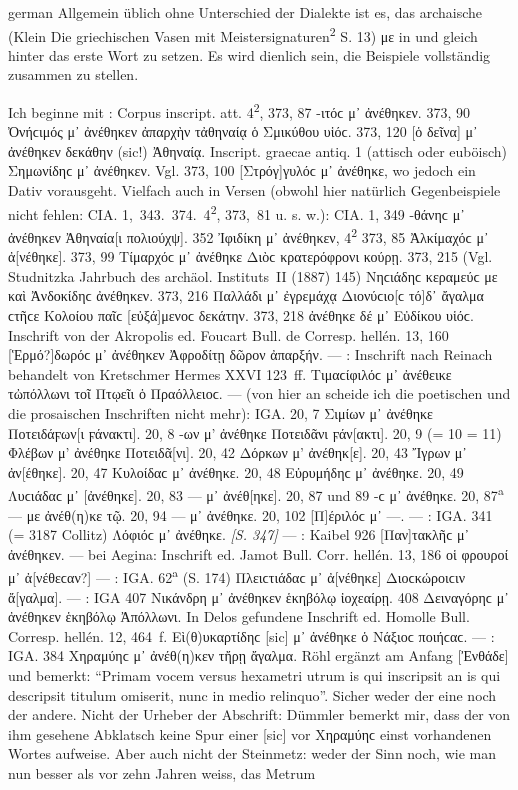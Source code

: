 \begin{otherlanguage*}{german}
Allgemein üblich ohne Unterschied der Dialekte ist es, das archaische (Klein Die griechischen Vasen mit Meistersignaturen\textsuperscript{2} S. 13) με in  und  gleich hinter das erste Wort zu setzen. Es wird dienlich sein, die Beispiele vollständig zusammen zu stellen.

Ich beginne mit :  Corpus inscript. att. 4\textsuperscript{2}, 373, 87 -ιτόϲ μ᾽ ἀνέθηκεν. 373, 90 Ὀνήϲιμός μ᾽ ἀνέθηκεν ἀπαρχὴν τἀθηναίᾳ ὁ Σμικύθου υἱόϲ. 373, 120 [ὁ δεῖνα] μ᾽ ἀνέθηκεν δεκάθην (sic!) Ἀθηναίᾳ. Inscript. graecae antiq. 1 (attisch oder euböisch) Σημωνίδηϲ μ᾽ ἀνέθηκεν. Vgl. 373, 100 [Στρόγ]γυλόϲ μ᾽ ἀνέθηκε, wo jedoch ein Dativ vorausgeht. Vielfach auch in Versen (obwohl hier natürlich Gegenbeispiele nicht fehlen: CIA. 1,~343.~374.~4\textsuperscript{2}, 373,~81 u. s. w.): CIA. 1, 349 -θάνηϲ μ᾽ ἀνέθηκεν Ἀθηναία[ι πολιούχψ]. 352 Ἰφιδίκη μ᾽ ἀνέθηκεν, 4\textsuperscript{2} 373, 85 Ἀλκίμαχόϲ μ᾽ ἀ[νέθηκε]. 373, 99 Τίμαρχόϲ μ᾽ ἀνέθηκε Διὸϲ κρατερόφρονι κούρῃ. 373, 215 (Vgl. Studnitzka Jahrbuch des archäol. Instituts~II (1887) 145) Νηϲιάδηϲ κεραμεύϲ με καὶ Ἀνδοκίδηϲ ἀνέθηκεν. 373, 216 Παλλάδι μ᾽ ἐγρεμάχᾳ Διονύϲιο[ϲ τό]δ᾽ ἄγαλμα ϲτῆϲε Κολοίου παῖϲ [εὐξά]μενοϲ δεκάτην. 373, 218 ἀνέθηκε δέ μ᾽ Εὐδίκου υἱόϲ. Inschrift von der Akropolis ed. Foucart Bull. de Corresp. hellén. 13, 160 [Ἑρμό?]δωρόϲ μ᾽ ἀνέθηκεν Ἀφροδίτῃ δῶρον ἀπαρξήν. — : Inschrift nach Reinach behandelt von Kretschmer Hermes XXVI 123~ff. Τιμαϲίφιλόϲ μ᾽ ἀνέθεικε τὠπόλλωνι τοῖ Πτῳεῖι ὁ Πραόλλειοϲ. —  (von hier an scheide ich die poetischen und die prosaischen Inschriften nicht mehr): IGA. 20, 7 Σιμίων μ᾽ ἀνέθηκε Ποτειδάϝων[ι ϝάνακτι]. 20, 8 -ων μ’ ἀνέθηκε Ποτειδᾶνι ϝάν[ακτι]. 20, 9 (= 10 = 11) Φλέβων μ’ ἀνέθηκε Ποτειδᾶ[νι]. 20, 42 Δόρκων μ’ ἀνέθηκ[ε]. 20, 43 Ἴγρων μ᾽ ἀν[έθηκε]. 20, 47 Κυλοίδαϲ μ᾽ ἀνέθηκε. 20, 48 Εὐρυμήδηϲ μ᾽ ἀνέθηκε. 20, 49 Λυϲιάδαϲ μ᾽ [ἀνέθηκε]. 20, 83 — μ᾽ ἀνέθ[ηκε]. 20, 87 und 89 -ϲ μ᾽ ἀνέθηκε. 20, 87\textsuperscript{a} — με ἀνέθ(η)κε τῷ. 20, 94 — μ᾽ ἀνέθηκε. 20, 102 [Π]έριλόϲ μ᾽ —. — : IGA. 341 (= 3187 Collitz) Λόφιόϲ μ᾽ ἀνέθηκε. \hypertarget{p347}{\emph{[S. 347]}}\label{p347} — : Kaibel 926 [Παν]τακλῆϲ μ᾽ ἀνέθηκεν. —  bei Aegina: Inschrift ed. Jamot Bull. Corr. \mbox{hellén}. 13, 186 οἱ φρουροί μ᾽ ἀ[νέθεϲαν?] — : IGA. 62\textsuperscript{a} (S. 174) Πλειϲτιάδαϲ μ᾽ ἀ[νέθηκε] Διοϲκώροιϲιν ἄ[γαλμα]. — : IGA 407 Νικάνδρη μ᾽ ἀνέθηκεν ἑκηβόλῳ ἰοχεαίρῃ. 408 Δειναγόρηϲ μ᾽ ἀνέθηκεν ἑκηβόλῳ Ἀπόλλωνι. In Delos gefundene Inschrift ed. Homolle Bull. Corresp. hellén. 12, 464~f. Εὶ(θ)υκαρτίδηϲ [sic] μ᾽ ἀνέθηκε ὁ Νάξιοϲ ποιήϲαϲ. — : IGA. 384 Χηραμύηϲ μ᾽ ἀνέθ(η)κεν τἤρῃ ἄγαλμα. Röhl ergänzt am Anfang [Ἐνθάδε] und bemerkt: “Primam vocem versus hexametri utrum is qui inscripsit an is qui descripsit titulum omiserit, nunc in medio relinquo”. Sicher weder der eine noch der andere. Nicht der Urheber der Abschrift: Dümmler bemerkt mir, dass der von ihm gesehene Abklatsch keine Spur einer [sic] vor Χηραμύηϲ einst vorhandenen Wortes aufweise. Aber auch nicht der Steinmetz: weder der Sinn noch, wie man nun besser als vor zehn Jahren weiss, das Metrum 
\end{otherlanguage*}
